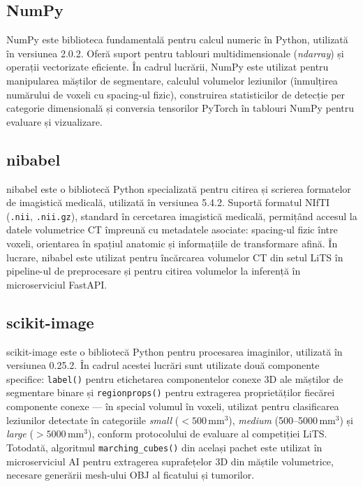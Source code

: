 \documentclass[12pt, a4paper]{report}
\begin{document}
\subsection{NumPy}

NumPy este biblioteca fundamentală pentru calcul numeric în Python, utilizată
în versiunea 2.0.2. Oferă suport pentru tablouri multidimensionale (\textit{ndarray})
și operații vectorizate eficiente. În cadrul lucrării, NumPy este utilizat
pentru manipularea măștilor de segmentare, calculul volumelor leziunilor
(înmulțirea numărului de voxeli cu spacing-ul fizic), construirea statisticilor
de detecție per categorie dimensională și conversia tensorilor PyTorch în
tablouri NumPy pentru evaluare și vizualizare.

\subsection{nibabel}

nibabel este o bibliotecă Python specializată pentru citirea și scrierea
formatelor de imagistică medicală, utilizată în versiunea 5.4.2. Suportă
formatul NIfTI (\texttt{.nii}, \texttt{.nii.gz}), standard în cercetarea
imagistică medicală, permițând accesul la datele volumetrice CT împreună cu
metadatele asociate: spacing-ul fizic între voxeli, orientarea în spațiul
anatomic și informațiile de transformare afină. În lucrare, nibabel este
utilizat pentru încărcarea volumelor CT din setul LiTS în pipeline-ul de
preprocesare și pentru citirea volumelor la inferență în microserviciul FastAPI.

\subsection{scikit-image}

scikit-image este o bibliotecă Python pentru procesarea imaginilor, utilizată
în versiunea 0.25.2. În cadrul acestei lucrări sunt utilizate două componente
specifice: \texttt{label()} pentru etichetarea componentelor conexe 3D ale
măștilor de segmentare binare și \texttt{regionprops()} pentru extragerea
proprietăților fiecărei componente conexe --- în special volumul în voxeli,
utilizat pentru clasificarea leziunilor detectate în categoriile
\textit{small} ($< 500$\,mm$^3$), \textit{medium} (500--5000\,mm$^3$) și
\textit{large} ($> 5000$\,mm$^3$), conform protocolului de evaluare al
competiției LiTS. Totodată, algoritmul \texttt{marching\_cubes()} din același
pachet este utilizat în microserviciul AI pentru extragerea suprafețelor 3D din
măștile volumetrice, necesare generării mesh-ului OBJ al ficatului și tumorilor.
\end{document}
